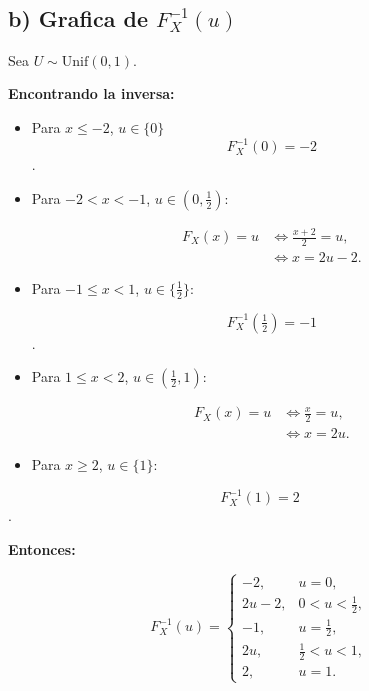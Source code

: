 \documentclass[10pt,a4paper]{article}
\let\le\leqslant
\let\ge\geqslant
\let\leq\leqslant
\let\geq\geqslant
\let\le\leq
\let\ge\geq
\begin{document}
    \begin{center}
    \end{center}
    { \hspace*{\fill} \\}
    
    \hypertarget{b-grafica-de-f_x-1u}{%
\subsection{\texorpdfstring{b) Grafica de
\(F_{X}^{-1}(u)\)}{b) Grafica de F\_\{X\}\^{}\{-1\}(u)}}\label{b-grafica-de-f_x-1u}}

    Sea \textbf{\(U\sim\mathrm{Unif}(0,1)\)}.

\textbf{Encontrando la inversa:}

\begin{itemize}
\item
  Para \(x\le -2\), \(u\in\{0\}\) \[
  F_X^{-1}(0)=-2
  \].
\item
  Para \(-2<x<-1\), \(u\in(0,\tfrac12)\):

  \[
  \begin{aligned}
  F_X(x)=u &\iff \frac{x+2}{2}=u,\\
           &\iff x=2u-2.
  \end{aligned}
  \]
\item
  Para \(-1\le x<1\), \(u\in\{\tfrac12\}\):

  \[
  F_X^{-1}(\tfrac12)=-1
  \].
\item
  Para \(1\le x<2\), \(u\in(\tfrac12,1)\):

  \[
  \begin{aligned}
  F_X(x)=u &\iff \frac{x}{2}=u,\\
           &\iff x=2u.
  \end{aligned}
  \]
\item
  Para \(x\ge 2\), \(u\in\{1\}\):
\end{itemize}

\[
F_X^{-1}(1)=2
\].

\textbf{Entonces:}

\[
F_X^{-1}(u)=
\begin{cases}
-2,& u=0,\\[4pt]
2u-2,& 0<u<\tfrac12,\\[4pt]
-1,& u=\tfrac12,\\[4pt]
2u,& \tfrac12<u<1,\\[4pt]
2,& u=1.
\end{cases}
\]
\end{document}
